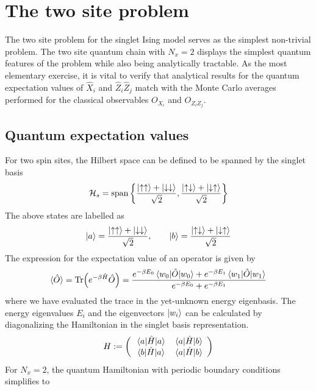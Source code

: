 \documentclass[../thesis_main.tex]{subfiles}
\begin{document}
\section{The two site problem}
The two site problem for the singlet Ising model serves as the simplest non-trivial problem. The two site quantum chain with $N_x = 2$ displays the simplest quantum features of the problem while also being analytically tractable. As the most elementary exercise, it is vital to verify that analytical results for the quantum expectation values of $\hat{X}_i$ and $\hat{Z}_i \hat{Z}_j$ match with the Monte Carlo averages performed for the classical observables $O_{X_i}$ and $O_{Z_i Z_j}$.

\subsection{Quantum expectation values}
For two spin sites, the Hilbert space can be defined to be spanned by the singlet basis
\begin{equation}
    \mathcal{H}_s = \text{span} \left\{\frac{\ket{\uparrow \uparrow} + \ket{\downarrow\downarrow}}{\sqrt{2}}, \frac{\ket{\uparrow\downarrow} + \ket{\downarrow\uparrow}}{\sqrt{2}} \right\}
\end{equation}
The above states are labelled as
\begin{equation} 
    \ket{a} = \frac{\ket{\uparrow \uparrow} + \ket{\downarrow\downarrow}}{\sqrt{2}}, \qquad \ket{b} = \frac{\ket{\uparrow\downarrow} + \ket{\downarrow\uparrow}}{\sqrt{2}}
\end{equation}
The expression for the expectation value of an operator is given by 
\begin{equation}
    \langle{\hat{O}}\rangle = \Tr(e^{-\beta \hat{H}} \hat{O}) = \frac{e^{-\beta E_0}\mel{w_0}{\hat{O}}{w_0} + e^{-\beta E_1}\mel{w_1}{\hat{O}}{w_1}}{e^{-\beta  E_0} + e^{-\beta E_1}}
\end{equation}
where we have evaluated the trace in the yet-unknown energy eigenbasis. The energy eigenvalues $E_i$ and the eigenvectors $\ket{w_i}$ can be calculated by diagonalizing the Hamiltonian in the singlet basis representation.
\begin{equation}
    H := \left(\begin{array}{cc}
    \mel{a}{\hat{H}}{a} & \mel{a}{\hat{H}}{b} \\ 
    \mel{b}{\hat{H}}{a} & \mel{a}{\hat{H}}{b}
    \end{array}\right)
\end{equation}
For $N_x = 2$, the quantum Hamiltonian with periodic boundary conditions simplifies to
\end{document}
